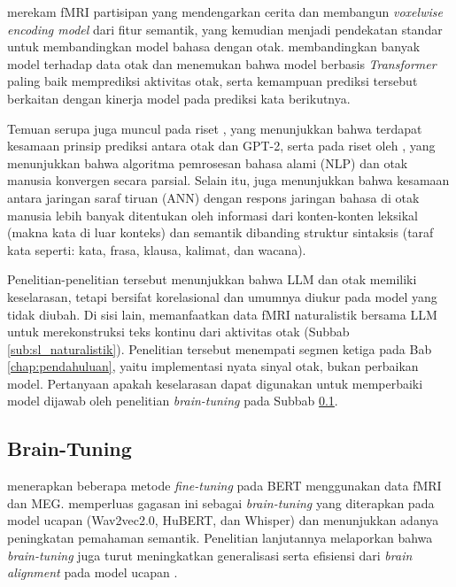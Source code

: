 \textcite{huth2016natural} merekam fMRI partisipan yang mendengarkan cerita dan membangun \textit{voxelwise encoding model} dari fitur semantik, yang kemudian menjadi pendekatan standar untuk membandingkan model bahasa dengan otak. \textcite{schrimpf2021neural} membandingkan banyak model terhadap data otak dan menemukan bahwa model berbasis \textit{Transformer} paling baik memprediksi aktivitas otak, serta kemampuan prediksi tersebut berkaitan dengan kinerja model pada prediksi kata berikutnya. %

Temuan serupa juga muncul pada riset \textcite{goldstein2022shared}, yang menunjukkan bahwa terdapat kesamaan prinsip prediksi antara otak dan GPT-2, serta pada riset oleh \textcite{caucheteux2022brains}, yang menunjukkan bahwa algoritma pemrosesan bahasa alami (NLP) dan otak manusia konvergen secara parsial. Selain itu, \textcite{kauf2024lexical} juga menunjukkan bahwa kesamaan antara jaringan saraf tiruan (ANN) dengan respons jaringan bahasa di otak manusia lebih banyak ditentukan oleh informasi dari konten-konten leksikal (makna kata di luar konteks) dan semantik dibanding struktur sintaksis (taraf kata seperti: kata, frasa, klausa, kalimat, dan wacana). %

Penelitian-penelitian tersebut menunjukkan bahwa LLM dan otak memiliki keselarasan, tetapi bersifat korelasional dan umumnya diukur pada model yang tidak diubah. Di sisi lain, \textcite{Tang2023858} memanfaatkan data fMRI naturalistik bersama LLM untuk merekonstruksi teks kontinu dari aktivitas otak (Subbab \ref{sub:sl_naturalistik}). Penelitian tersebut menempati segmen ketiga pada Bab \ref{chap:pendahuluan}, yaitu implementasi nyata sinyal otak, bukan perbaikan model. Pertanyaan apakah keselarasan dapat digunakan untuk memperbaiki model dijawab oleh penelitian \textit{brain-tuning} pada Subbab \ref{sub:plt_braintuning}.

\subsection{Brain-Tuning}
\label{sub:plt_braintuning}

\textcite{schwartz2019inducing} menerapkan beberapa metode \textit{fine-tuning} pada BERT menggunakan data fMRI dan MEG. %
\textcite{moussa2025improving} memperluas gagasan ini sebagai \textit{brain-tuning} yang diterapkan pada model ucapan (Wav2vec2.0, HuBERT, dan Whisper) dan menunjukkan adanya peningkatan pemahaman semantik. Penelitian lanjutannya melaporkan bahwa \textit{brain-tuning} juga turut meningkatkan generalisasi serta efisiensi dari \textit{brain alignment} pada model ucapan \autocite{moussa2026generalizability}. %

